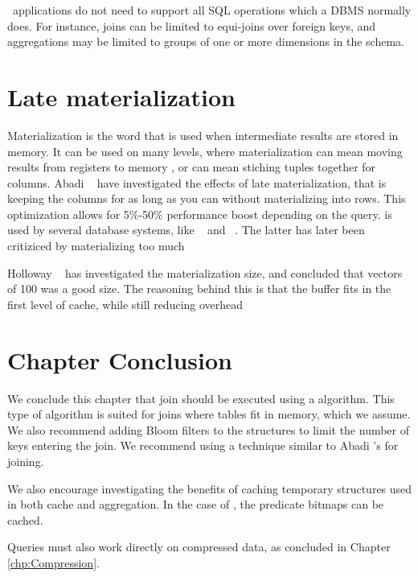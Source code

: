 \bd~applications do not need to support all SQL operations which a DBMS normally does. For instance, joins can be limited to equi-joins over foreign keys, and aggregations may be limited to groups of one or more dimensions in the schema.

\section{Late materialization}
\label{sec:Late materialization}
Materialization is the word that is used when intermediate results are stored in memory. It can be used on many levels, where materialization can mean moving results from registers to memory \cite{Neumann2011-uq}, or can mean stiching tuples together for columns. Abadi \ea~\cite{Abadi2008-dd} have investigated the effects of late materialization, that is keeping the columns for as long as you can without materializing into rows. This optimization allows for 5\%-50\% performance boost depending on the query.  is used by several database systems, like \ibm~\cite{Raman2013-em} and \monetdb~\cite{Boncz2002-yj}. The latter has later been critiziced by materializing too much \cite{Boncz2005-wj}

Holloway \ea~\cite{Holloway2008-rr} has investigated the materialization size, and concluded that vectors of 100 was a good size. The reasoning behind this is that the buffer fits in the first level of cache, while still reducing overhead
\section{Chapter Conclusion}
\label{sec:Chapter Conclusion}
We conclude this chapter that join should be executed using a  algorithm. This type of algorithm is suited for joins where tables fit in memory, which we assume. We also recommend adding Bloom filters to the structures to limit the number of keys entering the join. We recommend using a technique similar to Abadi \ea's  for joining.

We also encourage investigating the benefits of caching temporary structures used in both cache and aggregation. In the case of , the predicate bitmaps can be cached.

Queries must also work directly on compressed data, as concluded in Chapter \ref{chp:Compression}.
